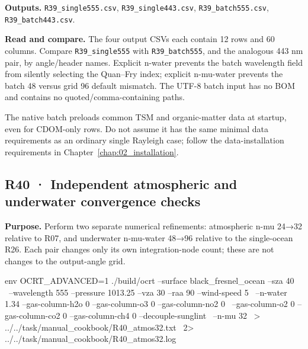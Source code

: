 \textbf{Outputs. }\texttt{R39\_\allowbreak{}single555.csv}, \texttt{R39\_\allowbreak{}single443.csv}, \texttt{R39\_\allowbreak{}batch555.csv}, \texttt{R39\_\allowbreak{}batch443.csv}.

\textbf{Read and compare. }The four output CSVs each contain 12 rows and 60 columns. Compare \texttt{R39\_\allowbreak{}single555} with \texttt{R39\_\allowbreak{}batch555}, and the analogous 443 nm pair, by angle/header names. Explicit n-water prevents the batch wavelength field from silently selecting the Quan–Fry index; explicit n-mu-water prevents the batch 48 versus grid 96 default mismatch. The UTF-8 batch input has no BOM and contains no quoted/comma-containing paths.

The native batch preloads common TSM and organic-matter data at startup, even for CDOM-only rows. Do not assume it has the same minimal data requirements as an ordinary single Rayleigh case; follow the data-installation requirements in Chapter~\ref{chap:02_installation}.

\clearpage

\subsection{R40 · Independent atmospheric and underwater convergence checks}
\label{sec:auto:09_cookbook:6.3}

\label{recipe:R40}

\textbf{Purpose. }Perform two separate numerical refinements: atmospheric n-mu 24→32 relative to R07, and underwater n-mu-water 48→96 relative to the single-ocean R26. Each pair changes only its own integration-node count; these are not changes to the output-angle grid.

\noindent\begin{minipage}{\linewidth}
\begin{ManualCode}

env OCRT_ADVANCED=1 ./build/ocrt --surface black_fresnel_ocean --sza 40 \
  --wavelength 555 --pressure 1013.25 --vza 30 --raa 90 --wind-speed 5 \
  --n-water 1.34 --gas-column-h2o 0 --gas-column-o3 0 --gas-column-no2 0 \
  --gas-column-o2 0 --gas-column-co2 0 --gas-column-ch4 0 --decouple-sunglint \
  --n-mu 32 \
  > ../../task/manual_cookbook/R40_atmos32.txt \
  2> ../../task/manual_cookbook/R40_atmos32.log

\end{ManualCode}
\end{minipage}\par


